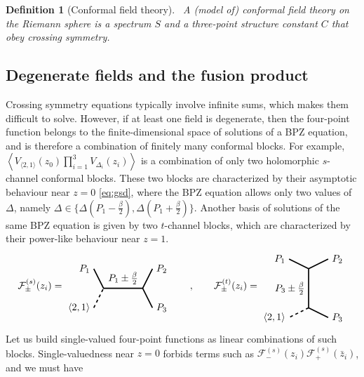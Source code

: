 \documentclass[12pt, a4paper]{article}
\theoremstyle{break}
\newtheorem{defn}[exo]{Definition}
\begin{document}
\begin{defn}[Conformal field theory]
~\label{def:cft}
A (model of) conformal field theory on the Riemann sphere is a spectrum $S$ and a three-point structure constant $C$ that obey crossing symmetry.
\end{defn}


\subsection{Degenerate fields and the fusion product}\label{sec:dffp}

Crossing symmetry equations typically involve infinite sums, which makes them difficult to solve.
However, if at least one field is degenerate, then the four-point function belongs to the finite-dimensional space of solutions of a BPZ equation, and is therefore a combination of finitely many conformal blocks. 
For example,
$\left< V_{\langle 2, 1 \rangle}(z_0) \prod_{i=1}^3 V_{\Delta_i}(z_i) \right>$ is a combination of only two holomorphic $s$-channel conformal blocks.
These two blocks are characterized by their asymptotic behaviour near $z=0$ \eqref{eq:gsd}, where the BPZ equation allows only two values of $\Delta$, namely $\Delta\in\{\Delta(P_1-\frac{\beta}{2}),\Delta(P_1+\frac{\beta}{2})\}$.
Another basis of solutions of the same BPZ equation is given by two $t$-channel blocks, which are characterized by their power-like behaviour near $z=1$.
\begin{align}
 \mathcal{F}^{(s)}_\pm(z_i)  =  
 \begin{tikzpicture}[baseline=(current  bounding  box.center), very thick, scale = .35]
\draw (-1,2) node [left] {$P_1$} -- (0,0) -- node [above] {$P_1\pm \frac{\beta}{2}$} (4,0) -- (5,2) node [right] {$P_2$};
\draw[dashed] (-1,-2) node [left] {$\langle 2,1 \rangle$} -- (0,0);
\draw (4,0) -- (5,-2) node [right] {$P_3$};
\end{tikzpicture}
\qquad , \qquad 
\mathcal{F}^{(t)}_\pm(z_i)  =  
 \begin{tikzpicture}[baseline=(current  bounding  box.center), very thick, scale = .35]
 \draw (-2,3) node [left] {$P_1$} -- (0,2) -- node [left] {$P_3\pm \frac{\beta}{2}$} (0,-2);
 \draw[dashed] (0, -2) -- (-2, -3) node [left] {$\langle 2,1 \rangle$};
\draw (0,2) -- (2,3) node [right] {$P_2$};
\draw (0,-2) -- (2, -3) node [right] {$P_3$};
\end{tikzpicture}
\label{gpic}
\end{align}
Let us build single-valued four-point functions as linear combinations of such blocks. Single-valuedness near $z=0$ forbids terms such as $\mathcal{F}^{(s)}_{-}(z_i) \mathcal{F}^{(s)}_{+}(\bar z_i)$, and we must have 
\end{document}
